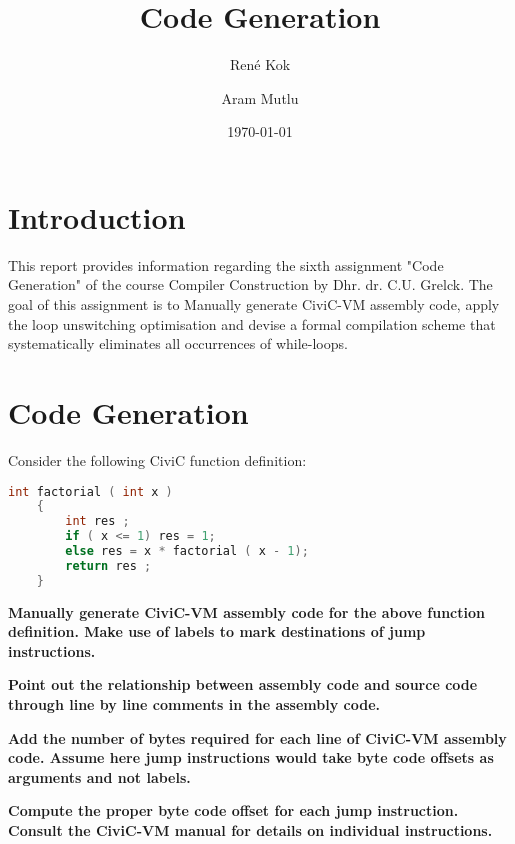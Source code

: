 \documentclass[hidelinks]{uva-inf-article}
\title{Code Generation}
\author{René Kok}
\author{Aram Mutlu}
\date{\today}
\begin{document}
\maketitle




\section{Introduction}
\begin{flushleft}
\par This report provides information regarding the sixth assignment 
"Code Generation" of the course Compiler Construction by Dhr.
dr. C.U. Grelck. The goal of this assignment is to  Manually generate CiviC-VM assembly code, apply the loop unswitching optimisation and
devise a formal compilation scheme that systematically eliminates all occurrences of 
while-loops.

\newpage
\section{Code Generation}
Consider the following CiviC function definition:
\begin{lstlisting}[basicstyle=\small, language=C, label=lst:code, caption=CiviC function definition, captionpos=b]
    int factorial ( int x )
    {
        int res ;
        if ( x <= 1) res = 1;
        else res = x * factorial ( x - 1);
        return res ;
    }

\end{lstlisting}

\textbf{Manually generate CiviC-VM assembly code for the above function definition. Make use of
labels to mark destinations of jump instructions.}


\textbf{Point out the relationship between assembly code and source code through line by line
comments in the assembly code.}


\textbf{Add the number of bytes required for each line of CiviC-VM assembly code. Assume here
jump instructions would take byte code offsets as arguments and not labels.}


\textbf{Compute the proper byte code offset for each jump instruction. Consult the CiviC-VM
manual for details on individual instructions.}

\end{flushleft}
\end{document}
